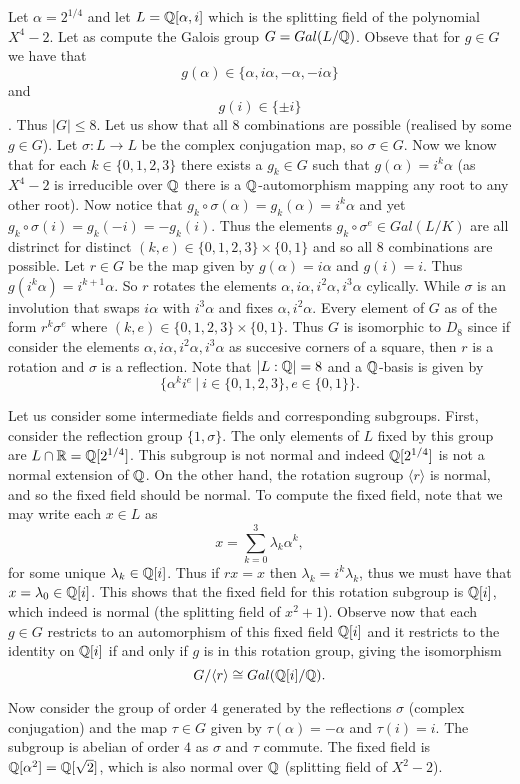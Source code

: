 \documentclass[twoside, a4paper, 10pt]{amsart}
\begin{document}
\begin{eg} Let $\alpha = 2^{1/4}$ and let $L = \mathbb{Q}[\alpha, i]$ which is the splitting field of the polynomial $X^4 - 2$. Let as compute the Galois group $G=Gal(L/\mathbb{Q})$. Obseve that for $g \in G$ we have that $$g(\alpha) \in \{\alpha, i \alpha, -\alpha, -i \alpha\}$$ and $$g(i) \in \{\pm i\}$$. Thus $|G| \leq 8$. Let us show that all $8$ combinations are possible (realised by some $g \in G$). Let $\sigma:L \to L$ be the complex conjugation map, so $\sigma \in G$. Now we know that for each $k \in \{0,1,2,3\}$ there exists a $g_k \in G$ such that $g(\alpha) = i^k \alpha$ (as $X^4-2$ is irreducible over $\mathbb{Q}$ there is a $\mathbb{Q}$-automorphism mapping any root to any other root). Now notice that $g_k \circ \sigma(\alpha) = g_k(\alpha) = i^k \alpha$ and yet $g_k \circ \sigma (i) = g_k(-i) = -g_k(i)$. Thus the elements $g_k \circ \sigma^{e} \in Gal(L/K)$ are all distrinct for distinct $(k,e) \in \{0,1, 2, 3\} \times \{0,1\}$ and so all $8$ combinations are possible. Let $ r \in G$ be the map given by $g(\alpha) = i\alpha$ and $g(i)=i$. Thus $g(i^k \alpha) = i^{k+1}\alpha$. So $r$ rotates the elements $\alpha, i\alpha, i^2\alpha, i^3\alpha$ cylically. While $\sigma$ is an involution that swaps $i\alpha$ with $i^3\alpha$ and fixes $\alpha, i^2\alpha$. Every element of $G$ as of the form $r^k \sigma^e$ where $(k,e) \in \{0,1,2,3\} \times \{0,1\}$. Thus $G$ is isomorphic to $D_8$ since if consider the elements $\alpha, i\alpha, i^2\alpha, i^3\alpha$ as succesive corners of a square, then $r$ is a rotation and $\sigma$ is a reflection. Note that $|L:\mathbb{Q}| = 8$ and a $\mathbb{Q}$-basis is given by $$\{\alpha^k i ^e ~|~ i \in \{0,1,2,3\}, e \in \{0,1\} \}.$$ 

Let us consider some intermediate fields and corresponding subgroups. First, consider the reflection group $\{1, \sigma\}$. The only elements of $L$ fixed by this group are $L \cap \mathbb{R} = \mathbb{Q}[2^{1/4}]$. This subgroup is not normal and indeed $\mathbb{Q}[2^{1/4}]$ is not a normal extension of $\mathbb{Q}$. On the other hand, the rotation sugroup $\langle r \rangle$ is normal, and so the fixed field should be normal. To compute the fixed field, note that we may write each $x \in L$ as $$x = \sum_{k=0}^3 \lambda_k \alpha^k,$$ for some unique $\lambda_k \in \mathbb{Q}[i]$. Thus if $rx=x$ then $\lambda_k = i^k \lambda_k$, thus we must have that $x = \lambda_0 \in \mathbb{Q}[i]$. This shows that the fixed field for this rotation subgroup is $\mathbb{Q}[i]$, which indeed is normal (the splitting field of $x^2+1$). Observe now that each $g \in G$ restricts to an automorphism of this fixed field $\mathbb{Q}[i]$ and it restricts to the identity on $\mathbb{Q}[i]$ if and only if $g$ is in this rotation group, giving the isomorphism $$G/\langle r \rangle \cong Gal(\mathbb{Q}[i]/\mathbb{Q}).$$

Now consider the group of order $4$ generated by the reflections $\sigma$ (complex conjugation) and the map $\tau \in G$ given by $\tau(\alpha) = -\alpha$ and $\tau(i) = i$. The subgroup is abelian of order $4$ as $\sigma$ and $\tau$ commute. The fixed field is $\mathbb{Q}[\alpha^2] = \mathbb{Q}[\sqrt{2}]$, which is also normal over $\mathbb{Q}$ (splitting field of $X^2-2$). \end{eg}
\end{document}
